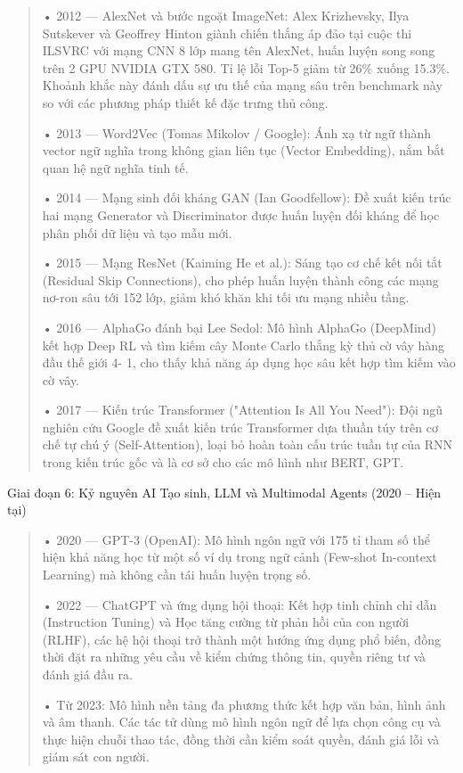 \begin{quote}
• 2012 --- AlexNet và bước ngoặt ImageNet: Alex Krizhevsky, Ilya
Sutskever và Geoffrey Hinton giành chiến thắng áp đảo tại cuộc thi
ILSVRC với mạng CNN 8 lớp mang tên AlexNet, huấn luyện song song trên 2
GPU NVIDIA GTX 580. Tỉ lệ lỗi Top-5 giảm từ 26\% xuống 15.3\%. Khoảnh
khắc này đánh dấu sự ưu thế của mạng sâu trên benchmark này so với các
phương pháp thiết kế đặc trưng thủ công.

• 2013 --- Word2Vec (Tomas Mikolov / Google): Ánh xạ từ ngữ thành vector
ngữ nghĩa trong không gian liên tục (Vector Embedding), nắm bắt quan hệ
ngữ nghĩa tinh tế.

• 2014 --- Mạng sinh đối kháng GAN (Ian Goodfellow): Đề xuất kiến trúc
hai mạng Generator và Discriminator được huấn luyện đối kháng để học
phân phối dữ liệu và tạo mẫu mới.

• 2015 --- Mạng ResNet (Kaiming He et al.): Sáng tạo cơ chế kết nối tắt
(Residual Skip Connections), cho phép huấn luyện thành công các mạng
nơ-ron sâu tới 152 lớp, giảm khó khăn khi tối ưu mạng nhiều tầng.

• 2016 --- AlphaGo đánh bại Lee Sedol: Mô hình AlphaGo (DeepMind) kết
hợp Deep RL và tìm kiếm cây Monte Carlo thắng kỳ thủ cờ vây hàng đầu thế
giới 4- 1, cho thấy khả năng áp dụng học sâu kết hợp tìm kiếm vào cờ vây.

• 2017 --- Kiến trúc Transformer ("Attention Is All You Need"): Đội ngũ
nghiên cứu Google đề xuất kiến trúc Transformer dựa thuần túy trên cơ
chế tự chú ý (Self-Attention), loại bỏ hoàn toàn cấu trúc tuần tự của
RNN trong kiến trúc gốc và là cơ sở cho các mô hình như BERT, GPT.
\end{quote}

Giai đoạn 6: Kỷ nguyên AI Tạo sinh, LLM và Multimodal Agents (2020 --
Hiện tại)

\begin{quote}
• 2020 --- GPT-3 (OpenAI): Mô hình ngôn ngữ với 175 tỉ tham số thể hiện
khả năng học từ một số ví dụ trong ngữ cảnh (Few-shot In-context Learning) mà
không cần tái huấn luyện trọng số.

• 2022 --- ChatGPT và ứng dụng hội thoại: Kết hợp tinh chỉnh chỉ dẫn
(Instruction Tuning) và Học tăng cường từ phản hồi của con người (RLHF),
các hệ hội thoại trở thành một hướng ứng dụng phổ biến, đồng thời đặt ra
những yêu cầu về kiểm chứng thông tin, quyền riêng tư và đánh giá đầu ra.

• Từ 2023: Mô hình nền tảng đa phương thức kết hợp văn bản, hình ảnh và
âm thanh. Các tác tử dùng mô hình ngôn ngữ để lựa chọn công cụ và thực
hiện chuỗi thao tác, đồng thời cần kiểm soát quyền, đánh giá lỗi và giám
sát con người.
\end{quote}

